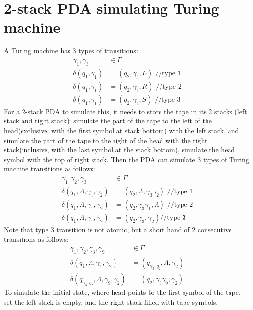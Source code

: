 \documentclass{article}
\begin{document}
\section{2-stack PDA simulating Turing machine}
 A Turing machine has 3 types of transitions:
\begin{align*}
\gamma_1, \gamma_3 &\in \Gamma\\
\delta(q_1, \gamma_1) &= (q_2, \gamma_3, L) \text{ //type 1}\\
\delta(q_1, \gamma_1) &= (q_2, \gamma_3, R) \text{ //type 2}\\
\delta(q_1, \gamma_1) &= (q_2, \gamma_3, S) \text{ //type 3}
\end{align*}
For a 2-stack PDA to simulate this, it needs to store the tape in its
2 stacks (left stack and right stack): simulate the part of the tape to the left
of the head(exclusive, with the first symbol at stack bottom) with the left
stack, and simulate the part of the tape to the right of the head with the
right stack(inclusive, with the last symbol at the stack bottom), simulate
the head symbol with the top of right stack. Then the PDA can simulate 3 types
of Turing machine transitions as follows:
\begin{align*}
\gamma_1, \gamma_2, \gamma_3 &\in \Gamma\\
\delta(q_1, \Lambda, \gamma_1, \gamma_2) &= (q_2, \Lambda, \gamma_3 \gamma_2)
\text{ //type 1}\\
\delta(q_1, \Lambda, \gamma_1, \gamma_2) &= (q_2, \gamma_3 \gamma_1, \Lambda)
\text{ //type 2}\\
\delta(q_1, \Lambda, \gamma_1, \gamma_2) &= (q_2, \gamma_3, \gamma_2) \text{
//type 3}
\end{align*}
Note that type 3 transition is not atomic, but a short hand of 2 consecutive
transitions as follows:
\begin{align*}
\gamma_1, \gamma_2, \gamma_3, \gamma_9 &\in \Gamma\\
\delta(q_1, \Lambda, \gamma_1, \gamma_2) &= (q_{\gamma_3, q_2}, \Lambda,
\gamma_2)\\
\delta(q_{\gamma_3, q_2}, \Lambda, \gamma_9, \gamma_2) &= (q_2,
\gamma_3\gamma_9, \gamma_2)
\end{align*}
To simulate the initial state, where head points to the first symbol of
the tape, set the left stack is empty, and the right stack filled with tape
symbols.
\end{document}
